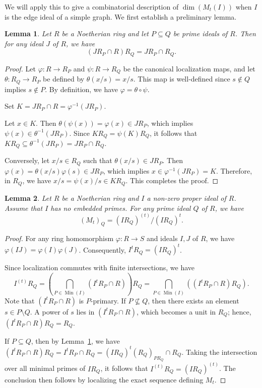 \documentclass[12pt]{amsart}
\def\Min{\operatorname{Min}}
\newtheorem{lemma}{Lemma}[section]
\begin{document}
We will apply this to give a combinatorial description of $\dim(M_t(I))$ when $I$ is the edge ideal of a simple graph. We first establish a preliminary lemma.

\begin{lemma}\label{lem_chain_localization}
Let $R$ be a Noetherian ring and let $P \subseteq Q$ be prime ideals of $R$. Then for any ideal $J$ of $R$, we have 
$$(J R_P \cap R) R_Q = J R_P \cap R_Q.$$
\end{lemma}

\begin{proof}
Let $\varphi \colon R \to R_P$ and $\psi \colon R \to R_Q$ be the canonical localization maps, and let $\theta \colon R_Q \to R_P$ be defined by $\theta(x/s) = x/s$. This map is well-defined since $s \notin Q$ implies $s \notin P$. By definition, we have $\varphi = \theta \circ \psi$. 

Set $K = J R_P \cap R = \varphi^{-1}(J R_P)$. 

Let $x \in K$. Then $\theta(\psi(x)) = \varphi(x) \in J R_P$, which implies $\psi(x) \in \theta^{-1}(J R_P)$. Since $K R_Q = \psi(K) R_Q$, it follows that $K R_Q \subseteq \theta^{-1}(J R_P) = J R_P \cap R_Q$.

Conversely, let $x/s \in R_Q$ such that $\theta(x/s) \in J R_P$. Then $\varphi(x) = \theta(x/s) \varphi(s) \in J R_P$, which implies $x \in \varphi^{-1}(J R_P) = K$. Therefore, in $R_Q$, we have $x/s = \psi(x)/s \in K R_Q$. This completes the proof.
\end{proof}

\begin{lemma}\label{lem_M_localization} 
Let $R$ be a Noetherian ring and $I$ a non-zero proper ideal of $R$. Assume that $I$ has no embedded primes. For any prime ideal $Q$ of $R$, we have 
$$(M_t)_Q = (I R_Q)^{(t)} / (I R_Q)^t.$$    
\end{lemma}

\begin{proof} 
For any ring homomorphism $\varphi \colon R \to S$ and ideals $I, J$ of $R$, we have $\varphi(I J) = \varphi(I) \varphi(J)$. Consequently, $I^t R_Q = (I R_Q)^t$. 

Since localization commutes with finite intersections, we have 
$$I^{(t)} R_Q = \left( \bigcap_{P \in \Min(I)} (I^t R_P \cap R) \right) R_Q = \bigcap_{P \in \Min(I)} \left( (I^t R_P \cap R) R_Q \right).$$
Note that $(I^t R_P \cap R)$ is $P$-primary. If $P \not\subseteq Q$, then there exists an element $s \in P \setminus Q$. A power of $s$ lies in $(I^t R_P \cap R)$, which becomes a unit in $R_Q$; hence, $(I^t R_P \cap R) R_Q = R_Q$. 

If $P \subseteq Q$, then by Lemma~\ref{lem_chain_localization}, we have $(I^t R_P \cap R) R_Q = I^t R_P \cap R_Q = (I R_Q)^t (R_Q)_{P R_Q} \cap R_Q$. Taking the intersection over all minimal primes of $I R_Q$, it follows that $I^{(t)} R_Q = (I R_Q)^{(t)}$. The conclusion then follows by localizing the exact sequence defining $M_t$.
\end{proof}
\end{document}
